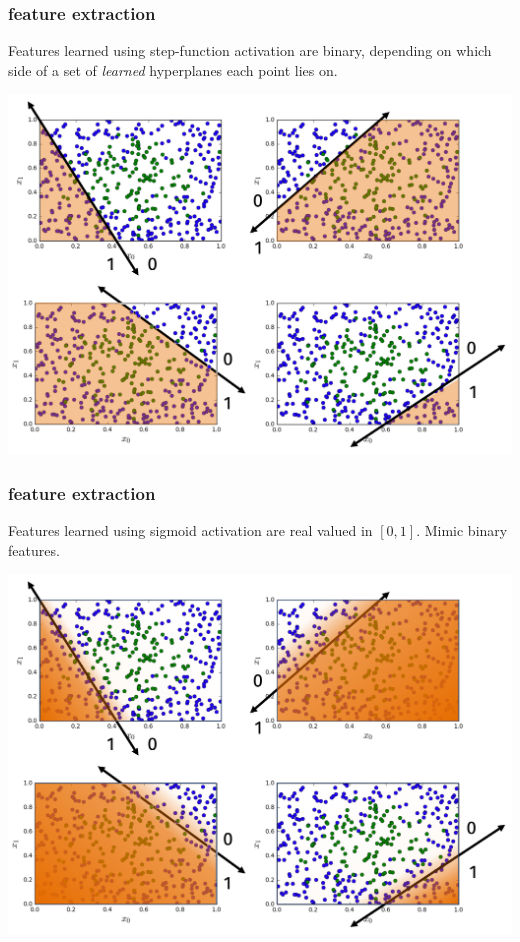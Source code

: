 \documentclass[handout,compress]{beamer}
\begin{document}
\begin{frame}
	\frametitle{feature extraction}
	Features learned using step-function activation are binary, depending on which side of a set of \emph{learned} hyperplanes each point lies on. 
	\begin{center}
		\includegraphics[width=.8\textwidth]{hard_features.png}
	\end{center}	
\end{frame}

\begin{frame}
	\frametitle{feature extraction}
	Features learned using sigmoid activation are real valued in $[0,1]$. Mimic binary features.  
	\begin{center}
		\includegraphics[width=.8\textwidth]{soft_features.png}
	\end{center}	
\end{frame}
\end{document}
